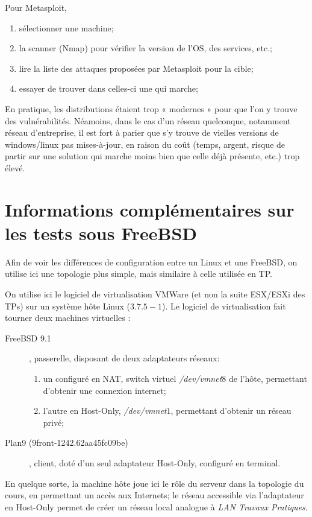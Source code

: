 \documentclass[a4paper]{article}
\begin{document}
Pour Metasploit,
\begin{enumerate}
	\item sélectionner une machine;
	\item la scanner (Nmap) pour vérifier la version de l'OS, des services, etc.;
	\item lire la liste des attaques proposées par Metasploit pour la cible;
	\item essayer de trouver dans celles-ci une qui marche;
\end{enumerate}

En pratique, les distributions étaient trop « modernes » pour que l'on y trouve
des vulnérabilités. Néamoins, dans le cas d'un réseau quelconque, notamment réseau
d'entreprise, il est fort à parier que s'y trouve de vielles versions de
windows/linux pas mises-à-jour, en raison du coût (temps, argent, risque de partir
sur une solution qui marche moins bien que celle déjà présente, etc.) trop élevé.

\newpage
\appendix
\section{Informations complémentaires sur les tests sous FreeBSD}
Afin de voir les différences de configuration entre un Linux
et une FreeBSD, on utilise ici une topologie plus simple, mais
similaire à celle utilisée en TP.

On utilise ici le logiciel de virtualisation VMWare (et non la suite ESX/ESXi des TPs) 
sur un système hôte Linux ($3.7.5-1$). Le logiciel de virtualisation fait tourner deux machines virtuelles
:
\begin{description}
	\item[FreeBSD 9.1], passerelle, disposant de deux adaptateurs
	réseaux:
	\begin{enumerate}
		\item un configuré en NAT, switch virtuel
			\textit{/dev/vmnet$8$} de l'hôte, permettant
			d'obtenir une connexion internet;
		\item l'autre en Host-Only, \textit{/dev/vmnet$1$},
			permettant d'obtenir un réseau privé;
	\end{enumerate}
	\item[Plan9 (9front-1242.62aa45fc09be)], client, doté
		d'un seul adaptateur Host-Only, configuré en terminal.
\end{description}

En quelque sorte, la machine hôte joue ici le rôle du serveur
dans la topologie du cours, en permettant un accès aux Internets;
le réseau accessible via l'adaptateur en Host-Only permet de
créer un réseau local analogue à \textit{LAN Travaux Pratiques}.
\end{document}
